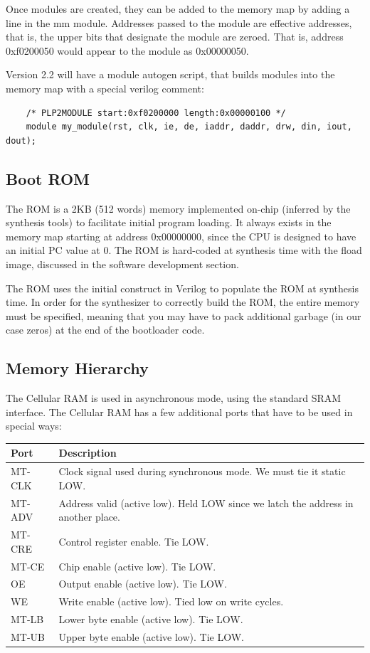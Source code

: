\documentclass{article}
\begin{document}
Once modules are created, they can be added to the memory map by adding a line in the mm module. Addresses passed to the module are effective addresses, that is, the upper bits that designate the module are zeroed. That is, address 0xf0200050 would appear to the module as 0x00000050.

Version 2.2 will have a module autogen script, that builds modules into the memory map with a special verilog comment:

\begin{verbatim}
	/* PLP2MODULE start:0xf0200000 length:0x00000100 */
	module my_module(rst, clk, ie, de, iaddr, daddr, drw, din, iout, dout);
\end{verbatim}

\subsection{Boot ROM}
The ROM is a 2KB (512 words) memory implemented on-chip (inferred by the synthesis tools) to facilitate initial program loading. It always exists in the memory map starting at address 0x00000000, since the CPU is designed to have an initial PC value at 0. The ROM is hard-coded at synthesis time with the fload image, discussed in the software development section.

The ROM uses the initial construct in Verilog to populate the ROM at synthesis time. In order for the synthesizer to correctly build the ROM, the entire memory must be specified, meaning that you may have to pack additional garbage (in our case zeros) at the end of the bootloader code.

\subsection{Memory Hierarchy}

The Cellular RAM is used in asynchronous mode, using the standard SRAM interface. The Cellular RAM has a few additional ports that have to be used in special ways:

\begin{tabular}{|l|l|}
 \hline
 
 \textbf{Port}&   \textbf{Description} 								\\ \hline
 MT-CLK       & Clock signal used during synchronous mode. We must tie it static LOW.\\ \hline
 MT-ADV	      & Address valid (active low). Held LOW since we latch the address in another place. \\ \hline
 MT-CRE       & Control register enable. Tie LOW. \\ \hline
 MT-CE        & Chip enable (active low). Tie LOW.\\ \hline
 OE           & Output enable (active low). Tie LOW.\\ \hline
 WE           & Write enable (active low). Tied low on write cycles.\\ \hline
 MT-LB        & Lower byte enable (active low). Tie LOW.\\ \hline
 MT-UB        & Upper byte enable (active low). Tie LOW.\\ \hline
\end{tabular}
\end{document}

